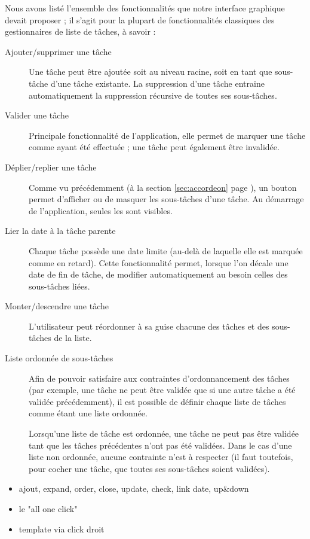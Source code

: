 \documentclass[11pt]{article}
\begin{document}
Nous avons listé l'ensemble des fonctionnalités que notre interface
graphique devait proposer ; il s'agit pour la plupart de
fonctionnalités classiques des gestionnaires de liste de tâches, à
savoir :
\begin{description}
\item[Ajouter/supprimer une tâche] Une tâche peut être ajoutée soit au
  niveau racine, soit en tant que sous-tâche d'une tâche existante. La
  suppression d'une tâche entraine automatiquement la suppression
  récursive de toutes ses sous-tâches.
\item[Valider une tâche] Principale fonctionnalité de l'application,
  elle permet de marquer une tâche comme ayant été effectuée ; une
  tâche peut également être invalidée.
\item[Déplier/replier une tâche] Comme vu précédemment (à la section
  \ref{sec:accordeon} page \pageref{sec:accordeon}), un bouton permet
  d'afficher ou de masquer les sous-tâches d'une tâche. Au démarrage
  de l'application, seules les  sont visibles.
\item[Lier la date à la tâche parente] Chaque tâche possède une date
  limite (au-delà de laquelle elle est marquée comme en retard). Cette
  fonctionnalité permet, lorsque l'on décale une date de fin de tâche,
  de modifier automatiquement au besoin celles des sous-tâches liées.
\item[Monter/descendre une tâche] L'utilisateur peut réordonner à sa
  guise chacune des tâches et des sous-tâches de la liste.
\item[Liste ordonnée de sous-tâches] Afin de pouvoir satisfaire aux
  contraintes d'ordonnancement des tâches (par exemple, une tâche ne
  peut être validée que si une autre tâche a été validée
  précédemment), il est possible de définir chaque liste de tâches
  comme étant une liste ordonnée.

  Lorsqu'une liste de tâche est ordonnée, une tâche ne peut pas être
  validée tant que les tâches précédentes n'ont pas été validées. Dans
  le cas d'une liste non ordonnée, aucune contrainte n'est à respecter
  (il faut toutefois, pour cocher une tâche, que toutes ses
  sous-tâches soient validées).
\end{description}


\begin{itemize}
\item ajout, expand, order, close, update, check, link date, up\&down
\item le "all one click"
\item template via click droit
\end{itemize}
\end{document}
